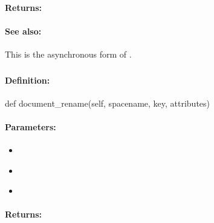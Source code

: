 \paragraph{Returns:}


\paragraph{See also:}  This is the asynchronous form of .

\pagebreak
\subsubsection{}
\label{api:python:document_rename}


\paragraph{Definition:}
\begin{pythoncode}
def document_rename(self, spacename, key, attributes)
\end{pythoncode}

\paragraph{Parameters:}
\begin{itemize}[noitemsep]
\item {}\\

\item {}\\

\item {}\\

\end{itemize}

\paragraph{Returns:}


\pagebreak
\subsubsection{}
\label{api:python:async_document_rename}


